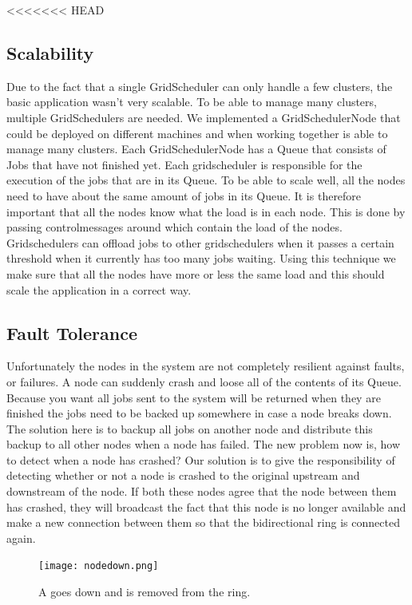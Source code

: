 \documentclass[twocolumn,a4paper]{article}
\begin{document}
<<<<<<< HEAD

\subsection{Scalability}
Due to the fact that a single GridScheduler can only handle a few clusters, the basic application wasn't very scalable. To be able to manage many clusters, multiple GridSchedulers are needed. We implemented a  GridSchedulerNode that could be deployed on different machines and when working together is able to manage many clusters. Each GridSchedulerNode has a Queue that consists of Jobs that have not finished yet. Each gridscheduler is responsible for the execution of the jobs that are in its Queue. To be able to scale well, all the nodes need to have about the same amount of jobs in its Queue. It is therefore important that all the nodes know what the load is in each node. This is done by passing controlmessages around which contain the load of the nodes. Gridschedulers can offload jobs to other gridschedulers when it passes a certain threshold when it currently has too many jobs waiting. Using this technique we make sure that all the nodes have more or less the same load and this should scale the application in a correct way.

\subsection{Fault Tolerance}
Unfortunately the nodes in the system are not completely resilient against faults, or failures. A node can suddenly crash and loose all of the contents of its Queue. Because you want all jobs sent to the system will be returned when they are finished the jobs need to be backed up somewhere in case a node breaks down. The solution here is to backup all jobs on another node and distribute this backup to all other nodes when a node has failed. The new problem now is, how to detect when a node has crashed? Our solution is to give the responsibility of detecting whether or not a node is crashed to the original upstream and downstream of the node. If both these nodes agree that the node between them has crashed, they will broadcast the fact that this node is no longer available and make a new connection between them so that the bidirectional ring is connected again.
\begin{figure}
  \texttt{[image: nodedown.png]}
  \caption{A goes down and is removed from the ring.}
\end{figure}
\end{document}
